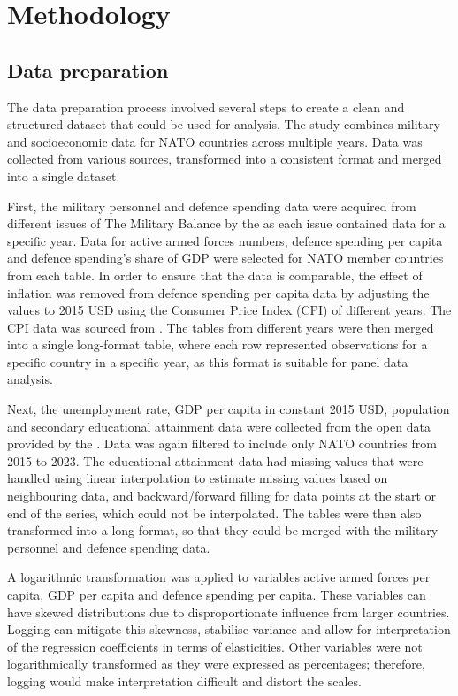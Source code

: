 \chapter{Methodology}

\section{Data preparation}

The data preparation process involved several steps to create a clean and structured 
dataset that could be used for analysis. The study combines military and socioeconomic 
data for NATO countries across multiple years. Data was collected from various sources,
transformed into a consistent format and merged into a single dataset.

First, the military personnel and defence 
spending data were acquired from different issues of The Military Balance by the 
\textcite{noauthor_military_balance_nodate} 
as each issue contained data for a specific year. Data for active armed forces numbers, 
defence spending per capita and defence spending's share of GDP were
selected for NATO member countries from each table.
In order to ensure that the data is comparable, the effect of inflation was removed 
from defence spending per capita data by adjusting the values to 2015 USD using the Consumer Price 
Index (CPI) of different years. The CPI data was sourced from \textcite{federal_reserve_bank_of_minneapolis_consumer_nodate}. 
The tables from different years were then merged into a single long-format table, where
each row represented observations for a specific country in a specific year, as this format is 
suitable for panel data analysis.

Next, the unemployment rate, GDP per capita in constant 2015 USD, population and 
secondary educational attainment data were collected from the open data provided by the
\textcite{noauthor_world_bank_nodate}. Data was again filtered to include 
only NATO countries from 2015 to 2023. 
The educational attainment 
data had missing values that were handled using linear interpolation to estimate missing values 
based on neighbouring data, and backward/forward filling for data points at the start or end 
of the series, which could not be interpolated. The tables were then also transformed into a long format, 
so that they could be 
merged with the military personnel and defence spending data.

A logarithmic transformation was applied to variables active armed forces per capita, GDP per capita 
and defence spending per capita. These variables can have skewed distributions due to disproportionate influence 
from larger countries. 
Logging can mitigate this skewness, stabilise variance and allow for interpretation of the regression 
coefficients in terms of elasticities. Other variables were not logarithmically transformed as they were 
expressed as percentages; therefore, logging would make interpretation difficult and distort the scales.

